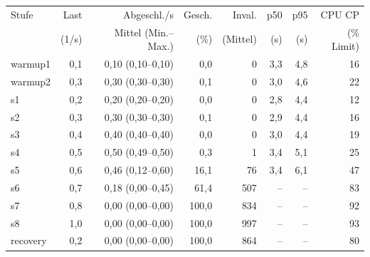 \begin{tabular}{lrrrrrrr}
\toprule
Stufe & Last & Abgeschl./s & Gesch. & Inval. & p50 & p95 & CPU CP \\
 & (1/s) & Mittel (Min.–Max.) & (\%) & (Mittel) & (s) & (s) & (\% Limit) \\
\midrule
warmup1 & 0,1 & 0,10 (0,10–0,10) & 0,0 & 0 & 3,3 & 4,8 & 16 \\
warmup2 & 0,3 & 0,30 (0,30–0,30) & 0,1 & 0 & 3,0 & 4,6 & 22 \\
s1 & 0,2 & 0,20 (0,20–0,20) & 0,0 & 0 & 2,8 & 4,4 & 12 \\
s2 & 0,3 & 0,30 (0,30–0,30) & 0,1 & 0 & 2,9 & 4,4 & 16 \\
s3 & 0,4 & 0,40 (0,40–0,40) & 0,0 & 0 & 3,0 & 4,4 & 19 \\
s4 & 0,5 & 0,50 (0,49–0,50) & 0,3 & 1 & 3,4 & 5,1 & 25 \\
s5 & 0,6 & 0,46 (0,12–0,60) & 16,1 & 76 & 3,4 & 6,1 & 47 \\
s6 & 0,7 & 0,18 (0,00–0,45) & 61,4 & 507 & – & – & 83 \\
s7 & 0,8 & 0,00 (0,00–0,00) & 100,0 & 834 & – & – & 92 \\
s8 & 1,0 & 0,00 (0,00–0,00) & 100,0 & 997 & – & – & 93 \\
recovery & 0,2 & 0,00 (0,00–0,00) & 100,0 & 864 & – & – & 80 \\
\bottomrule
\end{tabular}
